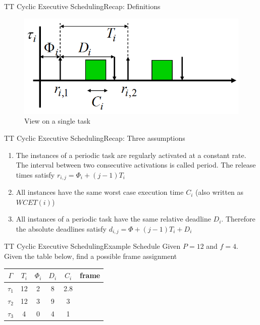\begin{frame}{TT Cyclic Executive Scheduling}{Recap: Definitions}
\begin{figure}
    \centering
    \includegraphics[scale=0.5]{figures/task_instance.png}
    \caption{View on a single task}
    \label{instanceView}
\end{figure}
\end{frame}

\begin{frame}{TT Cyclic Executive Scheduling}{Recap: Three assumptions}
\begin{enumerate}
    \item The instances of a periodic task are regularly activated at a constant rate. The interval between two consecutive activations is called period. The release times satisfy $r_{i,j} = \Phi_i + (j-1)T_i$
    \item All instances have the same worst case execution time $C_i$ (also written as $WCET(i)$)
    \item All instances of a periodic task have the same relative deadline $D_i$. Therefore the absolute deadlines satisfy $d_{i,j} = \Phi + (j-1)T_i + D_i$
\end{enumerate}
\end{frame}

\begin{frame}{TT Cyclic Executive Scheduling}{Example Schedule}
Given $P = 12$ and $f = 4$. Given the table below, find a possible frame assignment
\begin{center}
    \begin{tabular}{|c||c|c|c|c|c|}
    \hline
    $\Gamma$ & $T_i$ & $\Phi_i$ & $D_i$ & $C_i$ & frame\\
    \hline
    $\tau_1$ & 12 & 2 & 8 & 2.8 & \\
    \hline
    $\tau_2$ & 12 & 3 & 9 & 3 &\\
    \hline
    $\tau_3$ & 4 & 0 & 4 & 1 &\\
    \hline
\end{tabular}
\end{center}
\end{frame}

